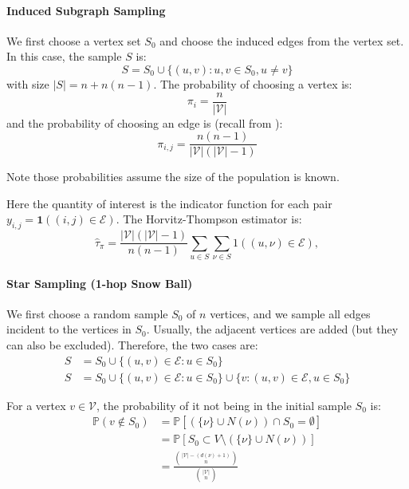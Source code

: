 \documentclass{article}
\begin{document}
\paragraph{Induced Subgraph Sampling} We first choose a vertex set $S_0$ and choose the induced edges from the vertex set. In this case, the sample $S$ is:
\begin{equation*}
    S = S_0 \cup \{(u,v): u,v\in S_0, u\neq v\}
\end{equation*}
with size $|S|=n+n(n-1)$. The probability of choosing a vertex is:
\begin{equation*}
    \pi_i = \frac{n}{|\mathcal{V}|}
\end{equation*}
and the probability of choosing an edge is (recall from ):
\begin{equation*}
    \pi_{i,j} = \frac{n(n-1)}{|\mathcal{V}|(|\mathcal{V}|-1)}
\end{equation*}

Note those probabilities assume the size of the population is known.  


\begin{example}
    Here the quantity of interest is the indicator function for each pair $y_{i,j}=\mathbf{1}((i,j)\in \mathcal{E})$. The Horvitz-Thompson estimator is:
    \begin{equation*}
        \hat{\tau}_{\pi}=\frac{|\mathcal{V}|(|\mathcal{V}|-1)}{n(n-1)}\sum_{u\in S}\sum_{\nu\in S}1((u,\nu)\in\mathcal{E}),
    \end{equation*}
\end{example}

\paragraph{Star Sampling (1-hop Snow Ball)} We first choose a random sample $S_0$ of $n$ vertices, and we sample all edges incident to the vertices in $S_0$. Usually, the adjacent vertices are added (but they can also be excluded). Therefore, the two cases are:
\begin{align*}
    S &= S_0\cup \{(u,v)\in \mathcal{E}: u\in S_0\}\\
    S &= S_0\cup \{(u,v)\in \mathcal{E}: u\in S_0\} \cup \{v: (u,v)\in \mathcal{E}, u\in S_0\}
\end{align*}
\begin{example}
    For a vertex $v\in \mathcal{V}$, the probability of it not being in the initial sample $S_0$ is:
    \begin{align*}
        \mathbb{P}(v\notin S_0) &= \mathbb{P}[\left(\{\nu\}\cup N(\nu)\right)\cap S_{0}=\emptyset]\\
        &= \mathbb{P}[S_{0}\subset V\setminus(\{\nu\}\cup N(\nu))]\\
        &= \frac{\binom{|\mathcal{V}|-(d(\nu)+1)}{n}}{\binom{|\mathcal{V}|}{n}}
    \end{align*}
\end{example}
\end{document}
